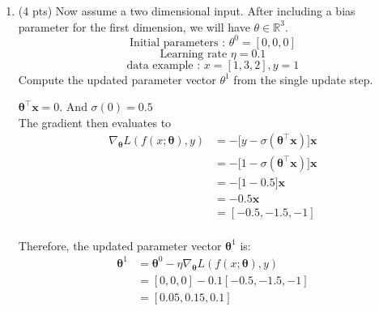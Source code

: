 \documentclass[a4paper]{article}
\theoremstyle{definition}
\newcommand{\vx}{\mathbf{x}}
\newcommand{\vtheta}{\mathbf{\theta}}
\newenvironment{soln}{
    \leavevmode\color{blue}\ignorespaces
}{}
\begin{document}
\begin{enumerate}
\begin{enumerate}
	\item (4 pts)
 Now assume a two dimensional input. After including a bias parameter for the first dimension, we will have $\theta\in\mathbb{R}^3$.
$$ \text{Initial parameters : }  \theta^{0}=[0, 0, 0]$$
$$ \text{Learning rate }\eta=0.1$$
$$ \text{data example : } x=[1, 3, 2], y=1$$
Compute the updated parameter vector $\theta^{1}$ from the single update step.
	
	\begin{soln}
		$\vtheta^\top \vx = 0$. And $\sigma(0) = 0.5$ \\
		The gradient then evaluates to
		\begin{align*}
		\nabla_{\vtheta} L(f(x;\vtheta), y) &= -\Big[y - \sigma(\vtheta^\top \vx)\Big] \vx \\
		&= -\Big[1 - \sigma(\vtheta^\top \vx)\Big] \vx \\
		&= -\Big[1 - 0.5\Big] \vx \\
		&= -0.5 \vx \\
		&= [-0.5, -1.5, -1] \\
		\end{align*}

		Therefore, the updated parameter vector $\vtheta^1$ is:
		\begin{align*}
		\vtheta^1 &= \vtheta^0 - \eta \nabla_{\vtheta} L(f(x;\vtheta), y) \\
		&= [0, 0, 0] - 0.1 [-0.5, -1.5, -1] \\
		&= [0.05, 0.15, 0.1] \\
		\end{align*}
	\end{soln}
\end{enumerate}
\end{enumerate}
\end{document}
